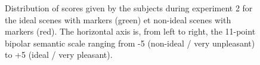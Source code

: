 \documentclass[12pt]{elsarticle}
\begin{document}
\begin{figure}[h]
         \par
        \caption{Distribution of scores given by the subjects during experiment 2 for the ideal scenes with markers (green) et non-ideal scenes with markers (red). The horizontal axis is, from left to right, the 11-point bipolar semantic scale ranging from -5 (non-ideal / very unpleasant) to +5 (ideal / very pleasant).}\label{fig:xp4_note_1}
\end{figure}
\end{document}
